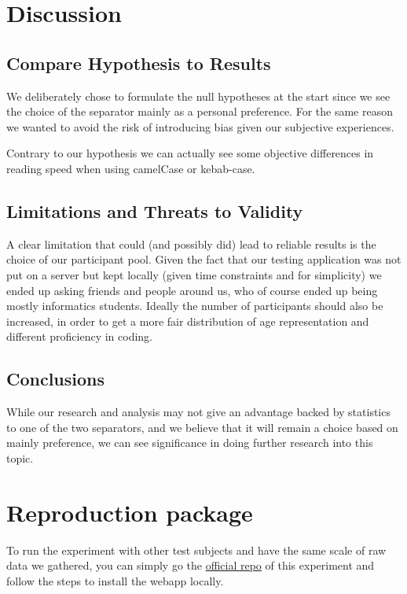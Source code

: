 \documentclass{article}
\begin{document}
\section{Discussion}

\subsection{Compare Hypothesis to Results}
We deliberately chose to formulate the null hypotheses at the start since we see the choice of the separator mainly as a personal preference. For the same reason 
we wanted to avoid the risk of introducing bias given our subjective experiences.

Contrary to our hypothesis we can actually see some objective differences in reading speed when using camelCase or kebab-case.

\subsection{Limitations and Threats to Validity}
A clear limitation that could (and possibly did) lead to reliable results is the choice of our participant pool. Given the fact that our testing application 
was not put on a server but kept locally (given time constraints and for simplicity) we ended up asking friends and people around us, who of course ended up being 
mostly informatics students. Ideally the number of participants should also be increased, in order to get a more fair distribution of age representation and different 
proficiency in coding.

\subsection{Conclusions}
While our research and analysis may not give an advantage backed by statistics to one of the two separators, and we believe that it will remain a choice based on mainly 
preference, we can see significance in doing further research into this topic.


\newpage

\appendix
\section{Reproduction package}
To run the experiment with other test subjects and have the same scale of raw
data we gathered, you can simply go the
\href{https://github.com/karma-riuk/camel-kebab}{official repo} of this
experiment and follow the steps to install the webapp locally.
\end{document}

